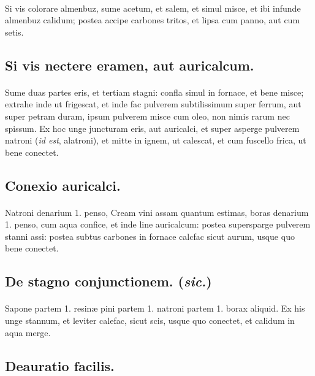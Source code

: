 \documentclass[a4paper, 11pt, oneside, polutonikogreek, italian]{article}
\begin{document}
\paragraph{}
Si vis colorare almenbuz, sume acetum, et salem, et simul misce, et ibi infunde almenbuz calidum; postea accipe carbones tritos, et lipsa cum panno, aut cum setis.

\subsection{Si vis nectere eramen, aut auricalcum.}
\paragraph{}
Sume duas partes eris, et tertiam stagni: confla simul in fornace, et bene misce; extrahe inde ut frigescat, et inde fac pulverem subtilissimum super ferrum, aut super petram duram, ipsum pulverem misce cum oleo, non nimis rarum nec spissum. Ex hoc unge juncturam eris, aut auricalci, et super asperge pulverem natroni (\emph{id est}, alatroni), et mitte in ignem, ut calescat, et cum fuscello frica, ut bene conectet.

\subsection{Conexio auricalci.}
\paragraph{}
Natroni denarium 1. penso, Cream vini assam quantum estimas, boras denarium 1. penso, cum aqua confice, et inde line auricalcum: postea supersparge pulverem stanni assi: postea subtus carbones in fornace calcfac sicut aurum, usque quo bene conectet.

\subsection{De stagno conjunctionem. (\emph{sic.})}
\paragraph{}
Sapone partem 1. resinæ pini partem 1. natroni partem 1. borax aliquid. Ex his unge stannum, et leviter calefac, sicut scis, usque quo conectet, et calidum in aqua merge.

\subsection{Deauratio facilis.}
\end{document}
